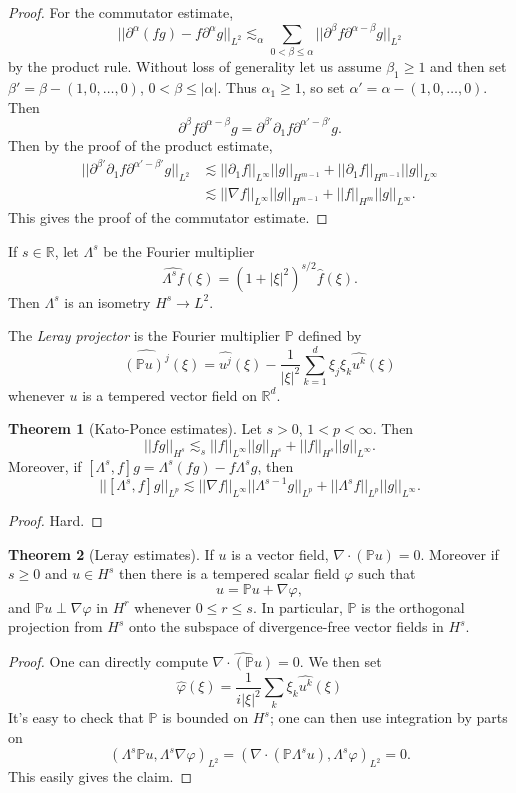 \documentclass[12pt]{book}
\newcommand{\RR}{\mathbb{R}}
\newcommand{\PP}{\mathbb{P}}
\newcommand{\dfn}[1]{\emph{#1}\index{#1}}
\theoremstyle{definition}
\newtheorem{theorem}{Theorem}[chapter]
\newenvironment{definition}
  {\pushQED{\qed}\renewcommand{\qedsymbol}{$\diamondsuit$}\definitionx}
  {\popQED\endexamplex}
\begin{document}
\begin{proof}
For the commutator estimate,
$$||\partial^\alpha(fg) - f\partial^\alpha g||_{L^2} \lesssim_\alpha \sum_{0 < \beta \leq \alpha} ||\partial^\beta f \partial^{\alpha - \beta}g||_{L^2}$$
by the product rule. Without loss of generality let us assume $\beta_1 \geq 1$ and then set $\beta' = \beta - (1, 0, \dots, 0)$, $0 < \beta \leq |\alpha|$.
Thus $\alpha_1 \geq 1$, so set $\alpha' = \alpha - (1, 0, \dots, 0)$.
Then
$$\partial^\beta f \partial^{\alpha - \beta}g = \partial^{\beta'}\partial_1f \partial^{\alpha' - \beta'}g.$$
Then by the proof of the product estimate,
\begin{align*}
||\partial^{\beta'}\partial_1f \partial^{\alpha' - \beta'}g||_{L^2} &\lesssim ||\partial_1f||_{L^\infty} ||g||_{H^{m-1}} + ||\partial_1f||_{H^{m-1}} ||g||_{L^\infty}\\
&\lesssim ||\nabla f||_{L^\infty} ||g||_{H^{m-1}} + ||f||_{H^m} ||g||_{L^\infty}.
\end{align*}
This gives the proof of the commutator estimate.
\end{proof}

If $s \in \RR$, let $\Lambda^s$ be the Fourier multiplier
$$\widehat{\Lambda^sf}(\xi) = (1 + |\xi|^2)^{s/2} \hat f(\xi).$$
Then $\Lambda^s$ is an isometry $H^s \to L^2$.

\begin{definition}
The \dfn{Leray projector} is the Fourier multiplier $\PP$ defined by
$$\widehat{(\PP u)^j}(\xi) = \widehat{u^j}(\xi) - \frac{1}{|\xi|^2} \sum_{k=1}^d \xi_j\xi_k \widehat{u^k}(\xi)$$
whenever $u$ is a tempered vector field on $\RR^d$.
\end{definition}

\begin{theorem}[Kato-Ponce estimates]
Let $s > 0$, $1 < p < \infty$. Then
$$||fg||_{H^s} \lesssim_s ||f||_{L^\infty} ||g||_{H^s} + ||f||_{H^s} ||g||_{L^\infty}.$$
Moreover, if $[\Lambda^s, f]g = \Lambda^s(fg) - f\Lambda^sg$, then
$$||[\Lambda^s, f]g||_{L^p} \lesssim ||\nabla f||_{L^\infty} ||\Lambda^{s-1}g||_{L^p} + ||\Lambda^sf||_{L^p} ||g||_{L^\infty}.$$
\end{theorem}
\begin{proof}
Hard.
\end{proof}

\begin{theorem}[Leray estimates]
If $u$ is a vector field, $\nabla \cdot(\PP u) = 0$.
Moreover if $s \geq 0$ and $u \in H^s$ then there is a tempered scalar field $\varphi$ such that
$$u = \PP u + \nabla \varphi,$$
and $\PP u \perp \nabla \varphi$ in $H^r$ whenever $0 \leq r \leq s$.
In particular, $\PP$ is the orthogonal projection from $H^s$ onto the subspace of divergence-free vector fields in $H^s$.
\end{theorem}
\begin{proof}
One can directly compute $\widehat{\nabla \cdot(\PP u)} = 0$.
We then set
$$\hat \varphi(\xi) = \frac{1}{i|\xi|^2} \sum_k \xi_k \widehat{u^k}(\xi)$$
It's easy to check that $\PP$ is bounded on $H^s$; one can then use integration by parts on
$$(\Lambda^s \PP u, \Lambda^s \nabla \varphi)_{L^2} = (\nabla \cdot(\PP\Lambda^su), \Lambda^s\varphi)_{L^2} = 0.$$
This easily gives the claim.
\end{proof}
\end{document}
